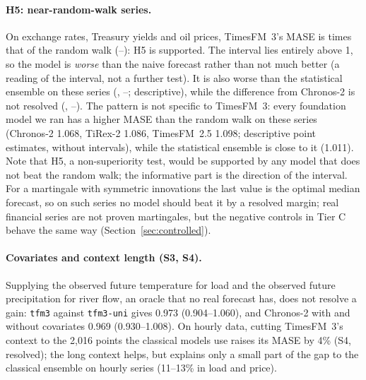 \paragraph{H5: near-random-walk series.} On exchange rates, Treasury yields and oil prices, TimesFM~3's MASE is \Hfive{} times that
of the random walk (\HfiveLo--\HfiveHi): H5 is supported. The interval lies entirely above 1, so the model is \emph{worse} than the naive
forecast rather than not much better (a reading of the interval, not a further test). It is also worse than the statistical ensemble on these series (\NrwStatEns,
\NrwStatEnsLo--\NrwStatEnsHi; descriptive), while the difference from Chronos-2 is not resolved (\NrwChronos,
\NrwChronosLo--\NrwChronosHi). The pattern is not specific to TimesFM~3: every foundation model we ran has a higher MASE than the random walk on these series
(Chronos-2 1.068, TiRex-2 1.086, TimesFM~2.5 1.098; descriptive point estimates, without intervals), while the statistical ensemble is close to it (1.011). Note that
H5, a non-superiority test, would be supported by any model that does not beat the random walk; the informative part is the
direction of the interval. For a martingale with symmetric innovations the last value is the optimal median forecast, so on such series no model should
beat it by a resolved margin; real financial series are not proven martingales, but the negative controls in Tier C behave the same way (Section~\ref{sec:controlled}).

\paragraph{Covariates and context length (S3, S4).} Supplying the observed future temperature for load and the observed future
precipitation for river flow, an oracle that no real forecast has, does not resolve a gain: \texttt{tfm3} against \texttt{tfm3-uni}
gives 0.973 (0.904--1.060), and Chronos-2 with and without covariates 0.969 (0.930--1.008). On hourly data, cutting TimesFM~3's
context to the 2{,}016 points the classical models use raises its MASE by 4\% (S4, resolved); the long context helps, but explains
only a small part of the gap to the classical ensemble on hourly series (11--13\% in load and price).

